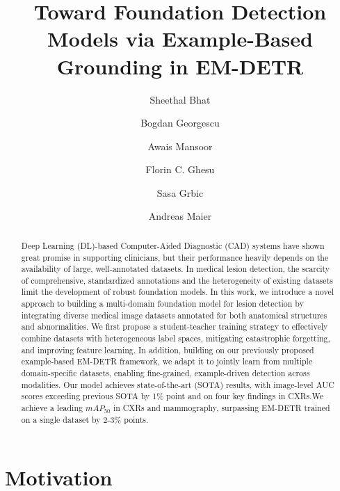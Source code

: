 \documentclass[runningheads]{llncs}
\begin{document}
%
\title{Toward Foundation Detection Models via Example-Based Grounding in EM-DETR}
%
%
\author{Sheethal Bhat \and
Bogdan Georgescu \and
Awais Mansoor \and
Florin C. Ghesu \and
Sasa Grbic \and
Andreas Maier}
%

%
\maketitle              %
%
\begin{abstract}
Deep Learning (DL)-based Computer-Aided Diagnostic (CAD) systems have shown great promise in supporting clinicians, but their performance heavily depends on the availability of large, well-annotated datasets. In medical lesion detection, the scarcity of comprehensive, standardized annotations and the heterogeneity of existing datasets limit the development of robust foundation models. In this work, we introduce a novel approach to building a multi-domain foundation model for lesion detection by integrating diverse medical image datasets annotated for both anatomical structures and abnormalities. We first propose a student-teacher training strategy to effectively combine datasets with heterogeneous label spaces, mitigating catastrophic forgetting, and improving feature learning. In addition, building on our previously proposed example-based EM-DETR framework, we adapt it to jointly learn from multiple domain-specific datasets, enabling fine-grained, example-driven detection across modalities. Our model achieves state-of-the-art (SOTA) results, with image-level AUC scores exceeding previous SOTA by 1\% point and on four key findings in CXRs.We achieve a leading $mAP_{50}$ in CXRs and mammography, surpassing EM-DETR trained on a single dataset by 2-3\% points. 

\end{abstract}

\section{Motivation}
\end{document}
